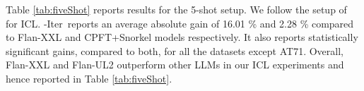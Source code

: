 





Table \ref{tab:fiveShot} reports results for the 5-shot setup. We follow the setup of \citet{yehudai2024llms} for ICL. \our-Iter~reports an average absolute gain of 16.01 \% and 2.28 \% compared to Flan-XXL and CPFT+Snorkel models respectively. It also reports statistically significant gains, compared to both, for all the datasets except AT71.  Overall, Flan-XXL and Flan-UL2 outperform other LLMs  \cite{touvron2023llama, jiang2023mistral} in our ICL experiments and hence reported in Table \ref{tab:fiveShot}. 



